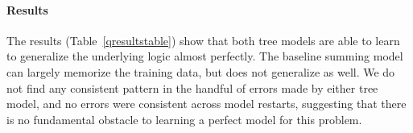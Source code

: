 %
%
\paragraph{Results} The results (Table~\ref{qresultstable}) show that both tree models are able to learn to generalize the underlying logic almost perfectly. The baseline summing model can largely memorize the training data, but does not generalize as well. We do not find any consistent pattern in the handful of errors made by either tree model, and no errors were consistent across model restarts, suggesting that there is no fundamental obstacle to learning a perfect model for this problem.

